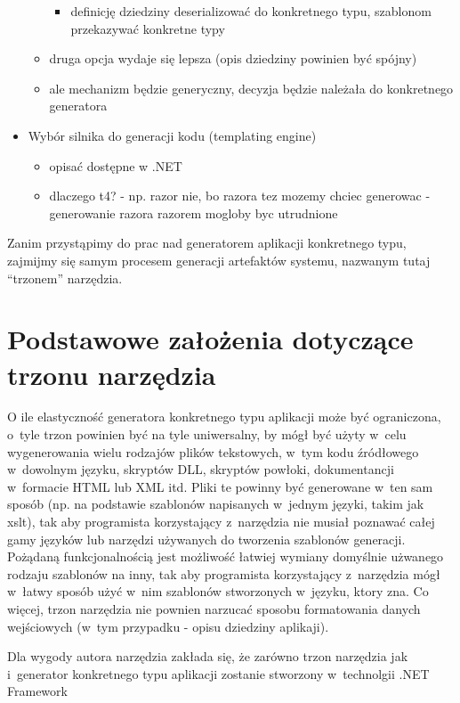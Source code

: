 \begin{itemize}
\begin{itemize}
\begin{itemize}
     \item definicję dziedziny deserializować do konkretnego typu, szablonom przekazywać konkretne typy
    \end{itemize}
   \item druga opcja wydaje się lepsza (opis dziedziny powinien być spójny)
   \item ale mechanizm będzie generyczny, decyzja będzie należała do konkretnego generatora
  \end{itemize}
 \item Wybór silnika do generacji kodu (templating engine)
  \begin{itemize}
   \item opisać dostępne w .NET
   \item dlaczego t4? - np. razor nie, bo razora tez mozemy chciec generowac - generowanie razora razorem mogloby byc utrudnione
  \end{itemize}
\end{itemize}

Zanim przystąpimy do prac nad generatorem aplikacji konkretnego typu, zajmijmy się samym procesem generacji artefaktów systemu, nazwanym tutaj ``trzonem'' narzędzia.



\section{Podstawowe założenia dotyczące trzonu narzędzia}

O ile elastyczność generatora konkretnego typu aplikacji może być ograniczona, o~tyle trzon powinien być na tyle uniwersalny, by mógł być użyty w~celu wygenerowania wielu rodzajów plików tekstowych, w~tym kodu źródłowego w~dowolnym języku, skryptów DLL, skryptów powłoki, dokumentancji w~formacie HTML lub XML itd.
Pliki te powinny być generowane w~ten sam sposób (np. na podstawie szablonów napisanych w~jednym języki, takim jak xslt), tak aby programista korzystający z~narzędzia nie musiał poznawać całej gamy języków lub narzędzi używanych do tworzenia szablonów generacji.
Pożądaną funkcjonalnością jest możliwość łatwiej wymiany domyślnie użwanego rodzaju szablonów na inny, tak aby programista korzystający z~narzędzia mógł w~łatwy sposób użyć w~nim szablonów stworzonych w~języku, ktory zna.
Co więcej, trzon narzędzia nie pownien narzucać sposobu formatowania danych wejściowych (w~tym przypadku - opisu dziedziny aplikaji).

Dla wygody autora narzędzia zakłada się, że zarówno trzon narzędzia jak i~generator konkretnego typu aplikacji zostanie stworzony w~technolgii .NET Framework




